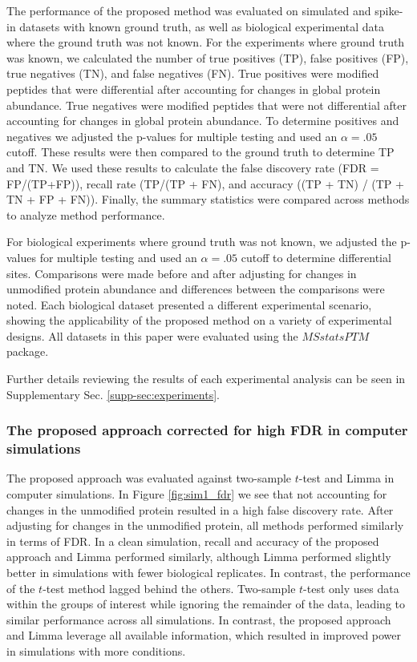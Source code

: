 \documentclass[mcp]{article}
\numberwithin{table}{section}
\begin{document}
The performance of the proposed method was evaluated on simulated and spike-in datasets with known ground truth, as well as biological experimental data where the ground truth was not known. For the experiments where ground truth was known, we calculated the number of true positives (TP), false positives (FP), true negatives (TN), and false negatives (FN). True positives were modified peptides that were differential after accounting for changes in global protein abundance. True negatives were modified peptides that were not differential after accounting for changes in global protein abundance. To determine positives and negatives we adjusted the p-values for multiple testing and used an $\alpha=.05$ cutoff. These results were then compared to the ground truth to determine TP and TN. We used these results to calculate the false discovery rate (FDR = FP/(TP+FP)), recall rate (TP/(TP + FN), and accuracy ((TP + TN) / (TP + TN + FP + FN)). Finally, the summary statistics were compared across methods to analyze method performance. 

For biological experiments where ground truth was not known, we adjusted the p-values for multiple testing and used an $\alpha=.05$ cutoff to determine differential sites. Comparisons were made before and after adjusting for changes in unmodified protein abundance and differences between the comparisons were noted. Each biological dataset presented a different experimental scenario, showing the applicability of the proposed method on a variety of experimental designs. All datasets in this paper were evaluated using the $MSstatsPTM$ package.

Further details reviewing the results of each experimental analysis can be seen in Supplementary Sec. \ref{supp-sec:experiments}. 

\subsubsection*{The proposed approach corrected for high FDR in computer simulations}

The proposed approach was evaluated against two-sample $t$-test and Limma in computer simulations. 
In Figure \ref{fig:sim1_fdr} we see that not accounting for changes in the unmodified protein resulted in a high false discovery rate. After adjusting for changes in the unmodified protein, all methods performed similarly in terms of FDR. In a clean simulation, recall and accuracy of the proposed approach and Limma performed similarly, although Limma performed slightly better in simulations with fewer biological replicates. In contrast, the performance of the $t$-test method lagged behind the others. Two-sample $t$-test only uses data within the groups of interest while ignoring the remainder of the data, leading to similar performance across all simulations. In contrast, the proposed approach and Limma leverage all available information, which resulted in improved power in simulations with more conditions.
\end{document}
